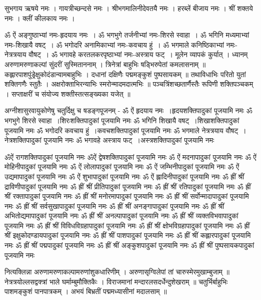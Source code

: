 सुभगाय ऋषये नमः । गायत्रीच्छन्दसे नमः । श्रीभगमालिनीदेवतयै नमः । हरब्लें बीजाय नमः । श्रीं शक्तये नमः । क्लीं कीलकाय नमः ।


ॐ ऐं अङ्गुष्ठाभ्यां नमः-हृदयाय नमः~। 
ॐ भगभुगे तर्जनीभ्यां नमः-शिरसे स्वाहा~।
ॐ भगिनि मध्यमाभ्यां नमः-शिखायै वषट्~।
ॐ भगोदरि अनामिकाभ्यां नमः-कवचाय हुं~।
ॐ भगमाले कनिष्ठिकाभ्यां नमः-नेत्रत्रयाय वौषट्~।
ॐ भगावहे करतलकरपृष्ठाभ्यां नमः-अस्त्राय फट्~।
मूलेन व्यापकं कुर्यात् ।
ध्यानम्
अरुणामरुणाकल्पां सुंदरीं सुस्मिताननाम् ।
त्रिनेत्रां बाहुभिः षड्भिरुपेतां कमलासनाम् ॥
कह्लारपाशपुंड्रेक्षुकोदंडान्वामबाहुभिः ।
दधानां दक्षिणैः पद्ममङ्कुशं पुष्पसायकम् ॥
तथाविधाभिः परितो युतां शक्तिगणैः स्तुतैः ।
अक्षरोक्ताभिरन्याभिः स्मरोन्मादमदात्मभिः ॥
पञ्चत्रिंशच्छतार्णैस्तैः रूपिणी शक्तिपञ्चकम् ।
सप्ताक्षरीं च संयोज्य शक्तीस्तत्सङ्ख्यका यजेत् ॥

अग्नीशासुरवायुकोणेषु चतुर्दिक्षु च षडङ्गपूजनम् -
ॐ ऐं हृदयाय नमः~।हृदयशक्तिपादुकां पूजयामि नमः
ॐ भगभुगे शिरसे स्वाहा~।शिरःशक्तिपादुकां पूजयामि नमः
ॐ भगिनि शिखायै वषट्~।शिखाशक्तिपादुकां पूजयामि नमः
ॐ भगोदरि कवचाय हुं~।कवचशक्तिपादुकां पूजयामि नमः
ॐ भगमाले नेत्रत्रयाय वौषट्~।नेत्रशक्तिपादुकां पूजयामि नमः
ॐ भगावहे अस्त्राय फट्~।अस्त्रशक्तिपादुकां पूजयामि नमः

ॐऐं रागशक्तिपादुकां पूजयामि नमः
ॐऐं द्वेषशक्तिपादुकां पूजयामि नमः
ॐ ऐं मदनापादुकां पूजयामि नमः
ॐ ऐं मोहिनीपादुकां पूजयामि नमः
ॐ ऐं लोलापादुकां पूजयामि नमः
ॐ ऐं जम्भिनीपादुकां पूजयामि नमः
ॐ ऐं उद्यमापादुकां पूजयामि नमः
ॐ ऐं शुभापादुकां पूजयामि नमः
ॐ ऐं ह्लादिनीपादुकां पूजयामि नमः
ॐ ह्रीं श्रीं द्राविणीपादुकां पूजयामि नमः
ॐ ह्रीं श्रीं प्रीतिपादुकां पूजयामि नमः
ॐ ह्रीं श्रीं रतिपादुकां पूजयामि नमः
ॐ ह्रीं श्रीं रक्तापादुकां पूजयामि नमः
ॐ ह्रीं श्रीं मनोरमापादुकां पूजयामि नमः
ॐ ह्रीं श्रीं सर्वोन्मादापादुकां पूजयामि नमः
ॐ ह्रीं श्रीं सर्वसुखापादुकां पूजयामि नमः
ॐ ह्रीं श्रीं अनङ्गापादुकां पूजयामि नमः
ॐ ह्रीं श्रीं अभितोद्यमापादुकां पूजयामि नमः
ॐ ह्रीं श्रीं अनल्पापादुकां पूजयामि नमः
ॐ ह्रीं श्रीं व्यक्तविभवापादुकां पूजयामि नमः
ॐ ह्रीं श्रीं विविधविग्रहापादुकां पूजयामि नमः
ॐ ह्रीं श्रीं क्षोभविग्रहापादुकां पूजयामि नमः
ॐ ह्रीं श्रीं इक्षुकोदण्डायपादुकां पूजयामि नमः
ॐ ह्रीं श्रीं पाशपादुकां पूजयामि नमः
ॐ ह्रीं श्रीं कह्लारपादुकां पूजयामि नमः
ॐ ह्रीं श्रीं पद्मपादुकां पूजयामि नमः
ॐ ह्रीं श्रीं अङ्कुशपादुकां पूजयामि नमः
ॐ ह्रीं श्रीं पुष्पसायकपादुकां पूजयामि नमः

नित्यक्लिन्ना 
अरुणामरुणाकल्पामरुणांशुकधारिणीम् । अरुणासृग्विलेपां तां चारुस्मेरमुखाम्बुजाम् ॥
नेत्रत्रयोल्लसद्वक्त्रां भाले घर्माम्बुमौक्तिकैः । विराजमानां मन्दारलसदर्धेन्दुशेखराम् ॥
चतुर्भिर्बाहुभिः पाशमङ्कुशं पानपात्रकम् । अभयं बिभ्रतीं पद्ममध्यासीनां मदालसाम् ॥

